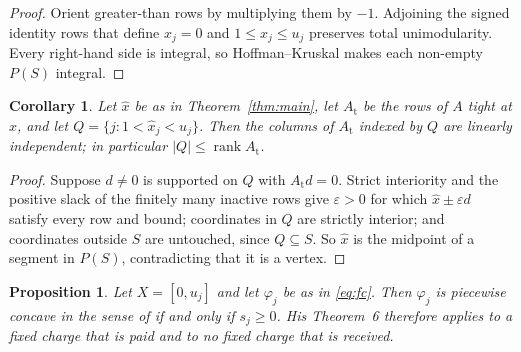 \documentclass[review,11pt]{elsarticle}
\newtheorem{proposition}[theorem]{Proposition}
\newtheorem{corollary}[theorem]{Corollary}
\theoremstyle{remark}
\theoremstyle{definition}
\begin{document}
\begin{proof}
Orient greater-than rows by multiplying them by $-1$. Adjoining the signed identity
rows that define $x_j=0$ and $1\le x_j\le u_j$ preserves total unimodularity. Every
right-hand side is integral, so Hoffman--Kruskal makes each non-empty $P(S)$ integral.
\end{proof}

\begin{corollary}\label{cor:count}
Let $\hat x$ be as in Theorem~\ref{thm:main}, let $A_{\mathrm{t}}$ be the rows of $A$
tight at $\hat x$, and let $Q=\{j:1<\hat x_j<u_j\}$. Then the columns of
$A_{\mathrm{t}}$ indexed by $Q$ are linearly independent; in particular
$|Q|\le\operatorname{rank}A_{\mathrm{t}}$.
\end{corollary}

\begin{proof}
Suppose $d\ne0$ is supported on $Q$ with $A_{\mathrm{t}}d=0$. Strict interiority and
the positive slack of the finitely many inactive rows give $\varepsilon>0$ for which
$\hat x\pm\varepsilon d$ satisfy every row and bound; coordinates in $Q$ are strictly
interior; and coordinates outside $S$ are untouched, since $Q\subseteq S$. So $\hat x$
is the midpoint of a segment in $P(S)$, contradicting that it is a vertex.
\end{proof}

\begin{proposition}\label{prop:zangwill}
Let $X=[0,u_j]$ and let $\varphi_j$ be as in \eqref{eq:fc}. Then $\varphi_j$ is piecewise
concave in the sense of \cite{zangwill67} \emph{if and only if} $s_j\ge0$. His Theorem~6
therefore applies to a fixed charge that is paid and to no fixed charge that is received.
\end{proposition}
\end{document}
